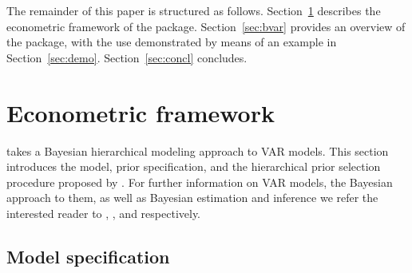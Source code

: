\documentclass[article,nojss]{jss} %
\begin{document}
The remainder of this paper is structured as follows. Section~\ref{sec:econ} describes the econometric framework of the package. Section~\ref{sec:bvar} provides an overview of the  package, with the use demonstrated by means of an example in Section~\ref{sec:demo}. Section~\ref{sec:concl} concludes.




\section{Econometric framework} \label{sec:econ}

 takes a Bayesian hierarchical modeling approach to VAR models. This section introduces the model, prior specification, and the hierarchical prior selection procedure proposed by \cite{giannone2015}. For further information on VAR models, the Bayesian approach to them, as well as Bayesian estimation and inference we refer the interested reader to \cite{kilian2017}, \cite{koop2010}, and \cite{gelman2013} respectively.

\subsection{Model specification} \label{subsec:model}
\end{document}
